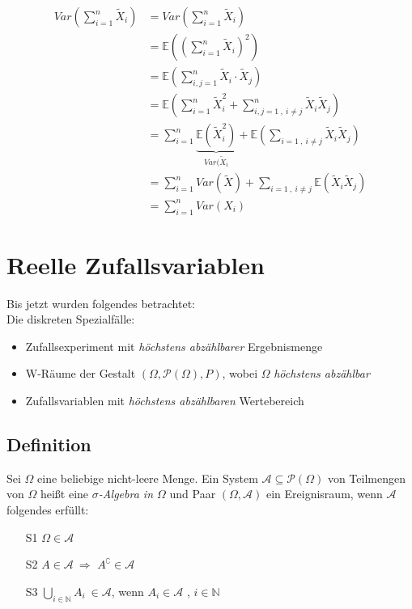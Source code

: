 \documentclass[12pt,a4paper]{article}
\begin{document}
	\begin{align*}
	Var\left(\sum_{i=1}^n \tilde{X}_i\right) &= Var\left(\sum_{i=1}^n \tilde{X}_i\right)\\
	&= \mathbb{E}\left(\left(\sum_{i=1}^n \tilde{X}_i \right)^2 \right)\\
	&= \mathbb{E}\left(\sum_{i,j=1}^n \tilde{X}_i \cdot \tilde{X}_j\right)\\
	&= \mathbb{E}\left(\sum_{i=1}^n \tilde{X}_i^2 + \sum_{i,j=1\: , \: i\neq j}^n  \tilde{X}_i \tilde{X}_j\right)\\
	&= \sum_{i=1}^n \underbrace{\mathbb{E}\left(\tilde{X}_i^2\right)}_{Var(\tilde{X}_i} + \mathbb{E}\left(\sum_{i=1\: , \: i\neq j} \tilde{X}_i \tilde{X}_j\right)\\
	&= \sum_{i=1}^n Var(\tilde{X}) + \sum_{i=1\: , \: i\neq j}\mathbb{E}\left(\tilde{X}_i \tilde{X}_j\right)\\
	&= \sum_{i=1}^n Var(X_i) 
	\end{align*}
	 
	\section{Reelle Zufallsvariablen}
	Bis jetzt wurden folgendes betrachtet:\\
	Die diskreten Spezialfälle:
	\begin{itemize}
		\item Zufallsexperiment mit \emph{höchstens abzählbarer} Ergebnismenge
		\item W-Räume der Gestalt $(\Omega, \mathcal{P}(\Omega),P)$, wobei $\Omega$ \emph{höchstens abzählbar}
		\item Zufallsvariablen mit \emph{höchstens abzählbaren} Wertebereich
	\end{itemize}
	
	\subsection{Definition}
	Sei $\Omega$ eine beliebige nicht-leere Menge. Ein System $\mathcal{A}\subseteq\mathcal{P}(\Omega)$ von Teilmengen von $\Omega$ heißt eine \textit{$\sigma$-Algebra in $\Omega$} und Paar $(\Omega,\mathcal{A})$ ein Ereignisraum, wenn $\mathcal{A}$ folgendes erfüllt:
	\begin{itemize}
		\item[S1] $\Omega\in\mathcal{A}$
		\item[S2] $A\in\mathcal{A}\: \Rightarrow$ $A^\complement \in \mathcal{A}$
		\item[S3] $\displaystyle \bigcup_{i\in\mathbb{N}} A_i \: \in\mathcal{A}$, wenn $A_i\in\mathcal{A}$ , $i\in\mathbb{N}$ 
	\end{itemize}
	
\end{document}
